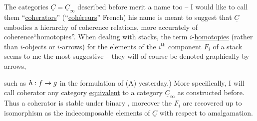 The categories $\underline{C}=\underline{C}_{\infty}$ described before merit a name too -- I would like to call them ``\uline{coherators}'' (``\uline{cohéreurs}''  French)  his name is meant to suggest that $\underline{C}$ embodies a hierarchy of coherence relations, more accurately of coherence``homotopies''. When dealing with stacks, the term $i$-\uline{homotopies} (rather than $i$-objects or $i$-arrows) for the elements of the $i^{\mathrm{th}}$ component $F_i$ of a stack seems to me the most suggestive -- they will of course be denoted graphically by arrows,


such as $h:f\to g$ in the formulation of (A) yesterday.) More specifically, I will call coherator any category \uline{equivalent} to a category $\underline{C}_{\infty}$ as constructed before.  Thus a coherator is stable under binary , moreover the $F_i$ are recovered up to isomorphism as the indecomposable elements of $\underline{C}$ with respect to amalgamation.
